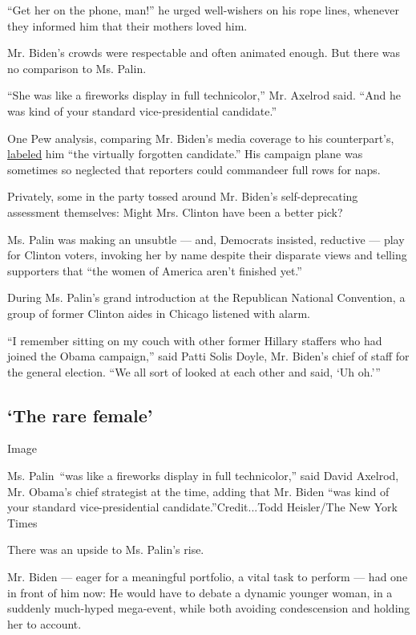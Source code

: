 ``Get her on the phone, man!'' he urged well-wishers on his rope lines,
whenever they informed him that their mothers loved him.

Mr. Biden's crowds were respectable and often animated enough. But there
was no comparison to Ms. Palin.

``She was like a fireworks display in full technicolor,'' Mr. Axelrod
said. ``And he was kind of your standard vice-presidential candidate.''

One Pew analysis, comparing Mr. Biden's media coverage to his
counterpart's,
\href{https://www.journalism.org/2008/09/15/pej-campaign-coverage-index-september-8-14-2008/}{labeled}
him ``the virtually forgotten candidate.'' His campaign plane was
sometimes so neglected that reporters could commandeer full rows for
naps.

Privately, some in the party tossed around Mr. Biden's self-deprecating
assessment themselves: Might Mrs. Clinton have been a better pick?

Ms. Palin was making an unsubtle --- and, Democrats insisted, reductive
--- play for Clinton voters, invoking her by name despite their
disparate views and telling supporters that ``the women of America
aren't finished yet.''

During Ms. Palin's grand introduction at the Republican National
Convention, a group of former Clinton aides in Chicago listened with
alarm.

``I remember sitting on my couch with other former Hillary staffers who
had joined the Obama campaign,'' said Patti Solis Doyle, Mr. Biden's
chief of staff for the general election. ``We all sort of looked at each
other and said, `Uh oh.'''

\hypertarget{the-rare-female}{%
\subsection{`The rare female'}\label{the-rare-female}}

Image

Ms. Palin~``was like a fireworks display in full technicolor,'' said
David Axelrod, Mr. Obama's chief strategist at the time, adding that Mr.
Biden ``was kind of your standard vice-presidential
candidate.''Credit...Todd Heisler/The New York Times

There was an upside to Ms. Palin's rise.

Mr. Biden --- eager for a meaningful portfolio, a vital task to perform
--- had one in front of him now: He would have to debate a dynamic
younger woman, in a suddenly much-hyped mega-event, while both avoiding
condescension and holding her to account.

